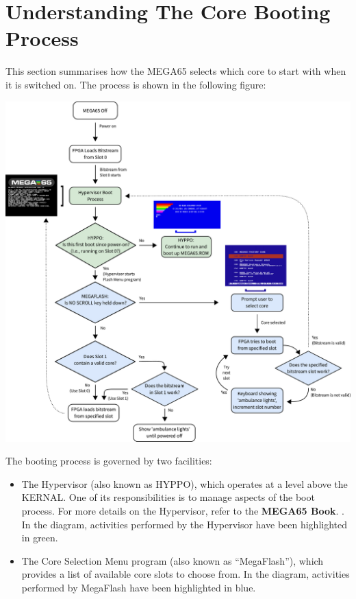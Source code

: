 \newpage

\section{Understanding The Core Booting Process}

This section summarises how the MEGA65 selects which core to start with when it is switched on. The process is shown in the following figure:

\includegraphics[width=\linewidth]{images/illustrations/flashmenu-flowchart.pdf}

The booting process is governed by two facilities:
\begin{itemize}
  \item The Hypervisor (also known as HYPPO), which operates at a level above the KERNAL. One of its responsibilities is to manage aspects of the boot process. For more details on the Hypervisor, refer to
\ifdefined\printmanual
the {\bf MEGA65 Book}.
\else
 .
\fi
    In the diagram, activities performed by the Hypervisor have been highlighted in green.
  \item The Core Selection Menu program (also known as ``MegaFlash''), which provides a list of available core slots to choose from. In the diagram, activities performed by MegaFlash have been highlighted in blue.
\end{itemize}

